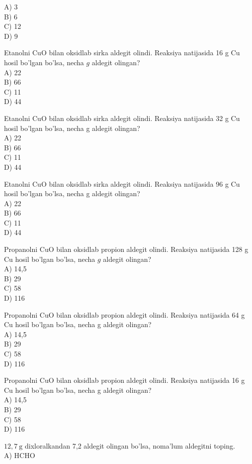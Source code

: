 A) 3\\
B) 6\\
C) 12\\
D) 9
  \item Etanolni CuO bilan oksidlab sirka aldegit olindi. Reaksiya natijasida 16 g Cu hosil bo'lgan bo'lsa, necha $g$ aldegit olingan?\\
A) 22\\
B) 66\\
C) 11\\
D) 44
  \item Etanolni CuO bilan oksidlab sirka aldegit olindi. Reaksiya natijasida 32 g Cu hosil bo'lgan bo'lsa, necha g aldegit olingan?\\
A) 22\\
B) 66\\
C) 11\\
D) 44
  \item Etanolni CuO bilan oksidlab sirka aldegit olindi. Reaksiya natijasida 96 g Cu\\
hosil bo'lgan bo'lsa, necha g aldegit olingan?\\
A) 22\\
B) 66\\
C) 11\\
D) 44
  \item Propanolni CuO bilan oksidlab propion aldegit olindi. Reaksiya natijasida 128 g Cu hosil bo'lgan bo'lsa, necha $g$ aldegit olingan?\\
A) 14,5\\
B) 29\\
C) 58\\
D) 116
  \item Propanolni CuO bilan oksidlab propion aldegit olindi. Reaksiya natijasida 64 g Cu hosil bo'lgan bo'lsa, necha g aldegit olingan?\\
A) 14,5\\
B) 29\\
C) 58\\
D) 116
  \item Propanolni CuO bilan oksidlab propion aldegit olindi. Reaksiya natijasida 16 g Cu hosil bo'lgan bo'lsa, necha g aldegit olingan?\\
A) 14,5\\
B) 29\\
C) 58\\
D) 116
  \item $12,7 \mathrm{~g}$ dixloralkandan 7,2 aldegit olingan bo'lsa, noma'lum aldegitni toping.\\
A) HCHO\\
